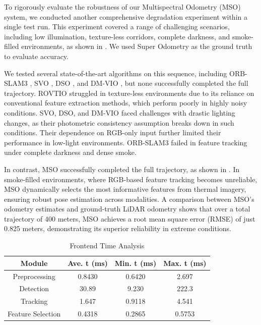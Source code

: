 To rigorously evaluate the robustness of our Multispectral Odometry (MSO) system, we conducted another comprehensive degradation experiment within a single test run. This experiment covered a range of challenging scenarios, including low illumination, texture-less corridors, complete darkness, and smoke-filled environments, as shown in . We used Super Odometry \cite{zhao2021super} as the ground truth to evaluate accuracy.

We tested several state-of-the-art algorithms on this sequence, including ORB-SLAM3 \cite{campos2021orb}, SVO \cite{forster2014svo}, DSO \cite{engel2017direct}, and DM-VIO \cite{von2022dm}, but none successfully completed the full trajectory. ROVTIO \cite{flemmen2021rovtio} struggled in texture-less environments due to its reliance on conventional feature extraction methods, which perform poorly in highly noisy conditions. SVO, DSO, and DM-VIO faced challenges with drastic lighting changes, as their photometric consistency assumption breaks down in such conditions. Their dependence on RGB-only input further limited their performance in low-light environments. ORB-SLAM3\cite{orbslam3} failed in feature tracking under complete darkness and dense smoke.

In contrast, MSO successfully completed the full trajectory, as shown in . In smoke-filled environments, where RGB-based feature tracking becomes unreliable, MSO dynamically selects the most informative features from thermal imagery, ensuring robust pose estimation across modalities. A comparison between MSO’s odometry estimates and ground-truth LiDAR odometry shows that over a total trajectory of 400 meters, MSO achieves a root mean square error (RMSE) of just 0.825 meters, demonstrating its superior reliability in extreme conditions.


\begin{table}
\footnotesize 
      \caption{Frontend Time Analysis}
      \centering
      \begin{tabular}{c|ccc}
        \toprule
        Module & Ave. t (ms) & Min. t (ms) & Max. t (ms) \\
        \midrule
        Preprocessing &  0.8430 &  0.6420 & 2.697   \\
        Detection &  30.89 & 9.230 & 222.3 \\
        Tracking & 1.647  &0.9118 & 4.541  \\
        Feature Selection &  0.4318 &0.2865 &0.5753 \\
        \bottomrule
      \end{tabular}
      \label{tab:time_analysis0}
\end{table}

